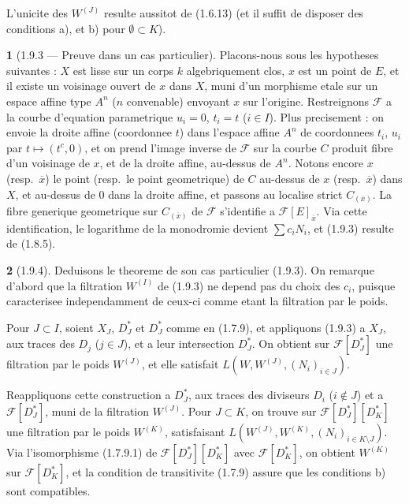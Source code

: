 \documentclass[12pt,a4paper]{article}
\theoremstyle{plain}
\theoremstyle{definition}
\theoremstyle{definition}
\newtheorem{para}{}[section]
\theoremstyle{remark}
\begin{document}
L'unicite des $W^{(J)}$ resulte aussitot de (1.6.13) (et il suffit de disposer des conditions a), et b) pour $\emptyset \subset K$).

\begin{para}[1.9.3 --- Preuve dans un cas particulier]
Placons-nous sous les hypotheses suivantes : $X$ est lisse sur un corps $k$ algebriquement clos, $x$ est un point de $E$, et il existe un voisinage ouvert de $x$ dans $X$, muni d'un morphisme etale sur un espace affine type $A^n$ ($n$ convenable) envoyant $x$ sur l'origine. Restreignons $\mathscr{F}$ a la courbe d'equation parametrique $u_i = 0$, $t_i = t$ ($i \in I$). Plus precisement : on envoie la droite affine (coordonnee $t$) dans l'espace affine $A^n$ de coordonnees $t_i$, $u_i$ par $t \mapsto (t^c, 0)$, et on prend l'image inverse de $\mathscr{F}$ sur la courbe $C$ produit fibre d'un voisinage de $x$, et de la droite affine, au-dessus de $A^n$. Notons encore $x$ (resp.~$\overline{x}$) le point (resp.~le point geometrique) de $C$ au-dessus de $x$ (resp.~$\overline{x}$) dans $X$, et au-dessus de $0$ dans la droite affine, et passons au localise strict $C_{(\overline{x})}$. La fibre generique geometrique sur $C_{(\overline{x})}$ de $\mathscr{F}$ s'identifie a $\mathscr{F}[E]_{\overline{x}}$. Via cette identification, le logarithme de la monodromie devient $\sum c_i N_i$, et (1.9.3) resulte de (1.8.5).
\end{para}

\begin{para}[1.9.4]
Deduisons le theoreme de son cas particulier (1.9.3). On remarque d'abord que la filtration $W^{(I)}$ de (1.9.3) ne depend pas du choix des $c_i$, puisque caracterisee independamment de ceux-ci comme etant la filtration par le poids.

Pour $J \subset I$, soient $X_J$, $D_J^*$ et $D_J^*$ comme en (1.7.9), et appliquons (1.9.3) a $X_J$, aux traces des $D_j$ ($j \in J$), et a leur intersection $D_J^*$. On obtient sur $\mathscr{F}[D_J^*]$ une filtration par le poids $W^{(J)}$, et elle satisfait $L(W, W^{(J)}, (N_i)_{i \in J})$.

Reappliquons cette construction a $D_J^*$, aux traces des diviseurs $D_i$ ($i \notin J$) et a $\mathscr{F}[D_J^*]$, muni de la filtration $W^{(J)}$. Pour $J \subset K$, on trouve sur $\mathscr{F}[D_J^*][D_K^*]$ une filtration par le poids $W^{(K)}$, satisfaisant $L(W^{(J)}, W^{(K)}, (N_i)_{i \in K \setminus J})$. Via l'isomorphisme (1.7.9.1) de $\mathscr{F}[D_J^*][D_K^*]$ avec $\mathscr{F}[D_K^*]$, on obtient $W^{(K)}$ sur $\mathscr{F}[D_K^*]$, et la condition de transitivite (1.7.9) assure que les conditions b) sont compatibles.
\end{para}
\end{document}
